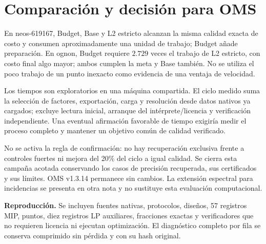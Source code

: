 \documentclass[10pt,a4paper]{article}
\begin{document}
\section{Comparación y decisión para OMS}
En neos-619167, Budget, Base y L2 estricto alcanzan la misma calidad exacta de
costo y consumen aproximadamente una unidad de trabajo; Budget añade preparación.
En ognon, Budget requiere $2.729$ veces el trabajo de L2 estricto, con costo final
algo mayor; ambos cumplen la meta y Base también. No se utiliza el poco trabajo
de un punto inexacto como evidencia de una ventaja de velocidad.

Los tiempos son exploratorios en una máquina compartida. El ciclo medido suma
la selección de factores, exportación, carga y resolución desde datos nativos ya cargados;
excluye lectura inicial, arranque del intérprete/licencia y verificación independiente.
Una eventual afirmación favorable de tiempo exigiría medir el proceso completo
y mantener un objetivo común de calidad verificado.

No se activa la regla de confirmación: no hay recuperación exclusiva frente a
controles fuertes ni mejora del 20\% del ciclo a igual calidad. Se cierra esta
campaña acotada conservando los casos de precisión recuperada, sus certificados
y sus límites. OMS v1.3.14 permanece sin cambios. La extensión espectral para
incidencias se presenta en otra nota y no sustituye esta evaluación computacional.

\noindent\textbf{Reproducción.} Se incluyen fuentes nativas, protocolos, diseños,
57 registros MIP, puntos, diez registros LP auxiliares, fracciones exactas y
verificadores que no requieren licencia ni ejecutan optimización. El diagnóstico
completo por fila se conserva comprimido sin pérdida y con su hash original.
\end{document}
